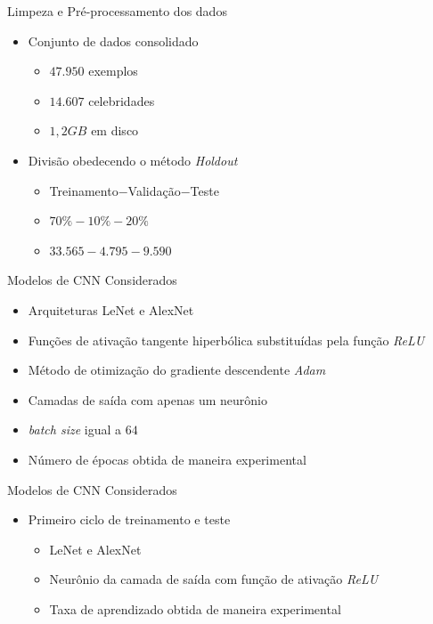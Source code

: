\begin{frame}{Limpeza e Pré-processamento dos dados}
     \begin{itemize}
          \item Conjunto de dados consolidado
          \begin{itemize}
               \item $47.950$ exemplos
               \item $14.607$ celebridades
               \item $1,2 GB$ em disco
          \end{itemize}
          \item Divisão obedecendo o método \emph{Holdout}
          \begin{itemize}
               \item Treinamento$-$Validação$-$Teste
               \item $70\%-10\%-20\%$
               \item $33.565-4.795-9.590$
          \end{itemize}
     \end{itemize}
\end{frame}

\begin{frame}{Modelos de CNN Considerados}
     \begin{itemize}
          \item Arquiteturas LeNet e AlexNet
          \item Funções de ativação tangente hiperbólica substituídas pela função \emph{ReLU}
          \item Método de otimização do gradiente descendente \emph{Adam}
          \item Camadas de saída com apenas um neurônio
          \item \emph{batch size} igual a $64$
          \item Número de épocas obtida de maneira experimental
     \end{itemize}
\end{frame}

\begin{frame}{Modelos de CNN Considerados}
     \begin{itemize}
          \item Primeiro ciclo de treinamento e teste
          \begin{itemize}
               \item LeNet e AlexNet
               \item Neurônio da camada de saída com função de ativação \emph{ReLU}
               \item Taxa de aprendizado obtida de maneira experimental
          \end{itemize}
     \end{itemize}
\end{frame}

